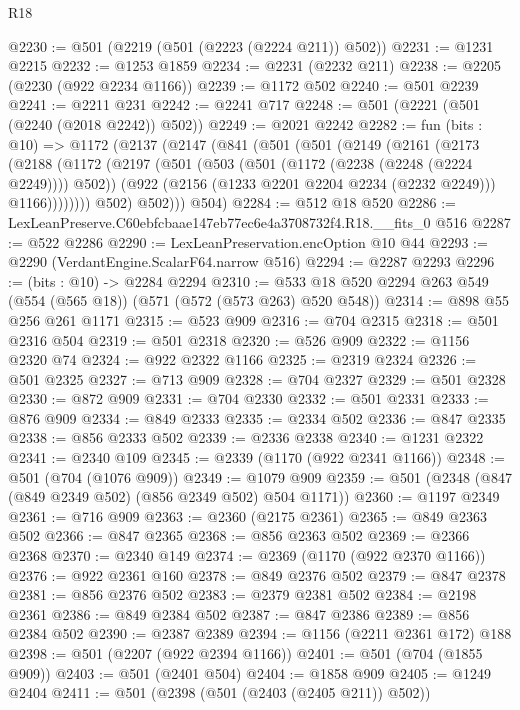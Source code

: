 \begin{lexlean}{R18}
\begin{coremodule}
@2230 := @501 (@2219 (@501 (@2223 (@2224 @211)) @502))
@2231 := @1231 @2215
@2232 := @1253 @1859
@2234 := @2231 (@2232 @211)
@2238 := @2205 (@2230 (@922 @2234 @1166))
@2239 := @1172 @502
@2240 := @501 @2239
@2241 := @2211 @231
@2242 := @2241 @717
@2248 := @501 (@2221 (@501 (@2240 (@2018 @2242)) @502))
@2249 := @2021 @2242
@2282 := fun (bits : @10) =>
  @1172
    (@2137
      (@2147
        (@841
          (@501
            (@501
              (@2149
                (@2161
                  (@2173
                    (@2188
                      (@1172
                        (@2197
                          (@501
                            (@503 (@501 (@1172 (@2238 (@2248 (@2224 @2249)))) @502))
                            (@922 (@2156 (@1233 @2201 @2204 @2234 (@2232 @2249))) @1166))))))))
              @502)
            @502)))
      @504)
@2284 := @512 @18 @520
@2286 := LexLeanPreserve.C60ebfcbaae147eb77ec6e4a3708732f4.R18.__fits_0 @516
@2287 := @522 @2286
@2290 := LexLeanPreservation.encOption @10 @44
@2293 := @2290 (VerdantEngine.ScalarF64.narrow @516)
@2294 := @2287 @2293
@2296 := (bits : @10) -> @2284 @2294
@2310 := @533 @18 @520 @2294 @263 @549 (@554 (@565 @18)) (@571 (@572 (@573 @263) @520 @548))
@2314 := @898 @55 @256 @261 @1171
@2315 := @523 @909
@2316 := @704 @2315
@2318 := @501 @2316 @504
@2319 := @501 @2318
@2320 := @526 @909
@2322 := @1156 @2320 @74
@2324 := @922 @2322 @1166
@2325 := @2319 @2324
@2326 := @501 @2325
@2327 := @713 @909
@2328 := @704 @2327
@2329 := @501 @2328
@2330 := @872 @909
@2331 := @704 @2330
@2332 := @501 @2331
@2333 := @876 @909
@2334 := @849 @2333
@2335 := @2334 @502
@2336 := @847 @2335
@2338 := @856 @2333 @502
@2339 := @2336 @2338
@2340 := @1231 @2322
@2341 := @2340 @109
@2345 := @2339 (@1170 (@922 @2341 @1166))
@2348 := @501 (@704 (@1076 @909))
@2349 := @1079 @909
@2359 := @501 (@2348 (@847 (@849 @2349 @502) (@856 @2349 @502) @504 @1171))
@2360 := @1197 @2349
@2361 := @716 @909
@2363 := @2360 (@2175 @2361)
@2365 := @849 @2363 @502
@2366 := @847 @2365
@2368 := @856 @2363 @502
@2369 := @2366 @2368
@2370 := @2340 @149
@2374 := @2369 (@1170 (@922 @2370 @1166))
@2376 := @922 @2361 @160
@2378 := @849 @2376 @502
@2379 := @847 @2378
@2381 := @856 @2376 @502
@2383 := @2379 @2381 @502
@2384 := @2198 @2361
@2386 := @849 @2384 @502
@2387 := @847 @2386
@2389 := @856 @2384 @502
@2390 := @2387 @2389
@2394 := @1156 (@2211 @2361 @172) @188
@2398 := @501 (@2207 (@922 @2394 @1166))
@2401 := @501 (@704 (@1855 @909))
@2403 := @501 (@2401 @504)
@2404 := @1858 @909
@2405 := @1249 @2404
@2411 := @501 (@2398 (@501 (@2403 (@2405 @211)) @502))

\end{coremodule}
\end{lexlean}
